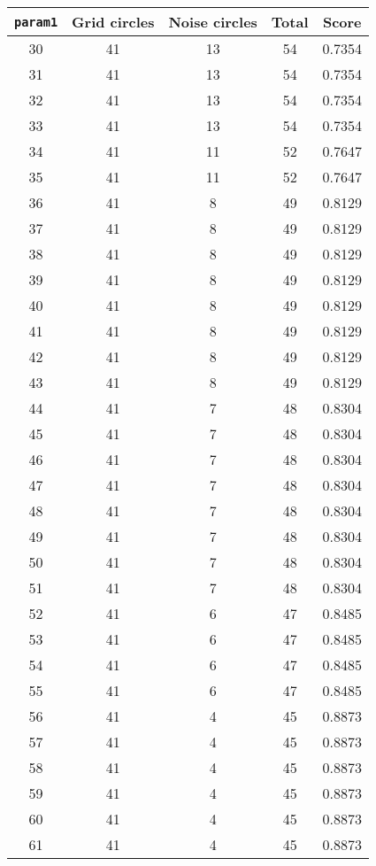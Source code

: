 \documentclass[letterpaper, 12pt]{article}
\begin{document}
\begin{longtable}{|c|c|c|c|c|}
\hline
\textbf{\texttt{param1}} & \textbf{Grid circles} & \textbf{Noise circles} & \textbf{Total} & \textbf{Score} \\
\hline
30 & 41 & 13 & 54 & 0.7354 \\
\hline
31 & 41 & 13 & 54 & 0.7354 \\
\hline
32 & 41 & 13 & 54 & 0.7354 \\
\hline
33 & 41 & 13 & 54 & 0.7354 \\
\hline
34 & 41 & 11 & 52 & 0.7647 \\
\hline
35 & 41 & 11 & 52 & 0.7647 \\
\hline
36 & 41 & 8 & 49 & 0.8129 \\
\hline
37 & 41 & 8 & 49 & 0.8129 \\
\hline
38 & 41 & 8 & 49 & 0.8129 \\
\hline
39 & 41 & 8 & 49 & 0.8129 \\
\hline
40 & 41 & 8 & 49 & 0.8129 \\
\hline
41 & 41 & 8 & 49 & 0.8129 \\
\hline
42 & 41 & 8 & 49 & 0.8129 \\
\hline
43 & 41 & 8 & 49 & 0.8129 \\
\hline
44 & 41 & 7 & 48 & 0.8304 \\
\hline
45 & 41 & 7 & 48 & 0.8304 \\
\hline
46 & 41 & 7 & 48 & 0.8304 \\
\hline
47 & 41 & 7 & 48 & 0.8304 \\
\hline
48 & 41 & 7 & 48 & 0.8304 \\
\hline
49 & 41 & 7 & 48 & 0.8304 \\
\hline
50 & 41 & 7 & 48 & 0.8304 \\
\hline
51 & 41 & 7 & 48 & 0.8304 \\
\hline
52 & 41 & 6 & 47 & 0.8485 \\
\hline
53 & 41 & 6 & 47 & 0.8485 \\
\hline
54 & 41 & 6 & 47 & 0.8485 \\
\hline
55 & 41 & 6 & 47 & 0.8485 \\
\hline
56 & 41 & 4 & 45 & 0.8873 \\
\hline
57 & 41 & 4 & 45 & 0.8873 \\
\hline
58 & 41 & 4 & 45 & 0.8873 \\
\hline
59 & 41 & 4 & 45 & 0.8873 \\
\hline
60 & 41 & 4 & 45 & 0.8873 \\
\hline
61 & 41 & 4 & 45 & 0.8873 \\

\end{longtable}
\end{document}
